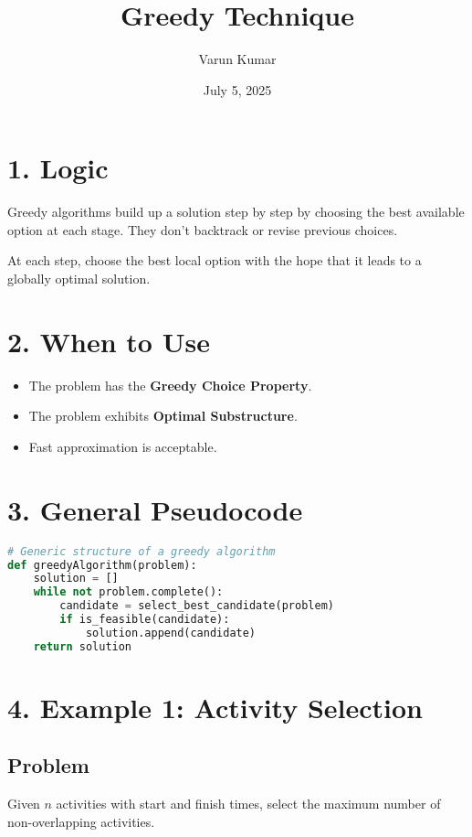 \documentclass[14pt]{extarticle}
\title{\textbf{Greedy Technique}}
\author{Varun Kumar}
\date{July 5, 2025}
\begin{document}
\maketitle

\section*{1. Logic}

Greedy algorithms build up a solution step by step by choosing the best available option at each stage. They don't backtrack or revise previous choices.

\begin{tcolorbox}[
  colback=white,
  colframe=black,
  title=Key Idea
]
At each step, choose the best local option with the hope that it leads to a globally optimal solution.
\end{tcolorbox}

\section*{2. When to Use}

\begin{itemize}
    \item The problem has the \textbf{Greedy Choice Property}.
    \item The problem exhibits \textbf{Optimal Substructure}.
    \item Fast approximation is acceptable.
\end{itemize}

\section*{3. General Pseudocode}

\begin{lstlisting}[language=Python]
# Generic structure of a greedy algorithm
def greedyAlgorithm(problem):
    solution = []
    while not problem.complete():
        candidate = select_best_candidate(problem)
        if is_feasible(candidate):
            solution.append(candidate)
    return solution
\end{lstlisting}

\newpage
\section*{4. Example 1: Activity Selection}

\subsection*{Problem}
Given $n$ activities with start and finish times, select the maximum number of non-overlapping activities.
\end{document}
